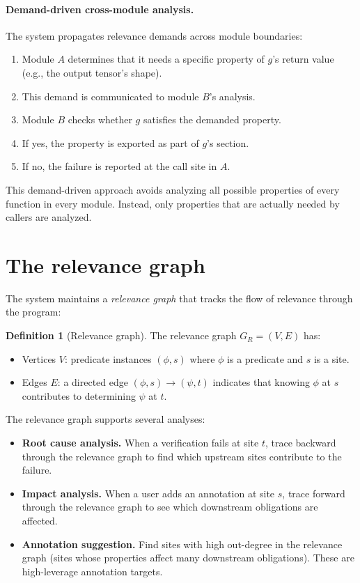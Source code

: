 \documentclass[11pt]{report}
\theoremstyle{definition}
\newtheorem{definition}{Definition}[section]
\theoremstyle{plain}
\begin{document}
\paragraph{Demand-driven cross-module analysis.}
The system propagates relevance demands across module boundaries:
\begin{enumerate}[nosep]
  \item Module $A$ determines that it needs a specific property of $g$'s
        return value (e.g., the output tensor's shape).
  \item This demand is communicated to module $B$'s analysis.
  \item Module $B$ checks whether $g$ satisfies the demanded property.
  \item If yes, the property is exported as part of $g$'s section.
  \item If no, the failure is reported at the call site in $A$.
\end{enumerate}

This demand-driven approach avoids analyzing all possible properties of every
function in every module. Instead, only properties that are actually needed
by callers are analyzed.

\section{The relevance graph}

The system maintains a \emph{relevance graph} that tracks the flow of
relevance through the program:

\begin{definition}[Relevance graph]
The relevance graph $G_R = (V, E)$ has:
\begin{itemize}[nosep]
  \item Vertices $V$: predicate instances $(\phi, s)$ where $\phi$ is a
        predicate and $s$ is a site.
  \item Edges $E$: a directed edge $(\phi, s) \to (\psi, t)$ indicates
        that knowing $\phi$ at $s$ contributes to determining $\psi$ at $t$.
\end{itemize}
\end{definition}

The relevance graph supports several analyses:
\begin{itemize}[nosep]
  \item \textbf{Root cause analysis.} When a verification fails at site $t$,
        trace backward through the relevance graph to find which upstream
        sites contribute to the failure.
  \item \textbf{Impact analysis.} When a user adds an annotation at site $s$,
        trace forward through the relevance graph to see which downstream
        obligations are affected.
  \item \textbf{Annotation suggestion.} Find sites with high out-degree in
        the relevance graph (sites whose properties affect many downstream
        obligations). These are high-leverage annotation targets.
\end{itemize}
\end{document}
